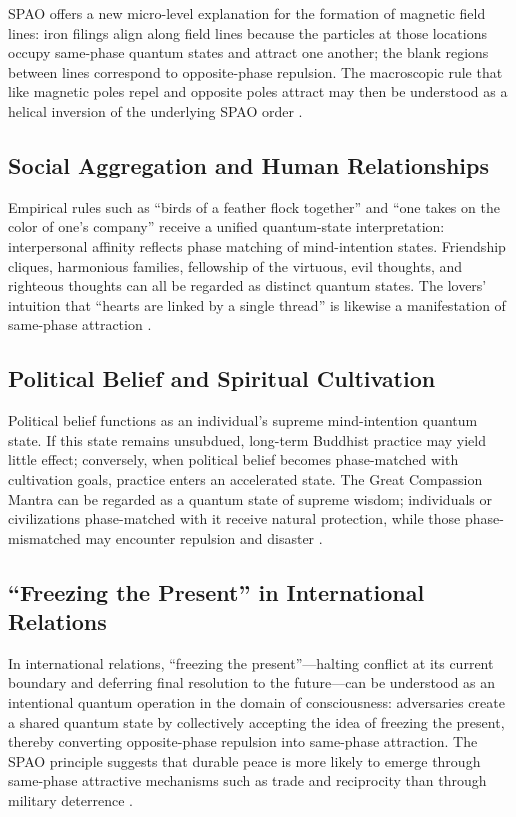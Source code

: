 \documentclass[11pt,a4paper]{article}
\begin{document}
SPAO offers a new micro-level explanation for the formation of magnetic field lines: iron filings align along field lines because the particles at those locations occupy same-phase quantum states and attract one another; the blank regions between lines correspond to opposite-phase repulsion. The macroscopic rule that like magnetic poles repel and opposite poles attract may then be understood as a helical inversion of the underlying SPAO order \cite{Feynman1964}.

\subsection{Social Aggregation and Human Relationships}

Empirical rules such as ``birds of a feather flock together'' and ``one takes on the color of one's company'' receive a unified quantum-state interpretation: interpersonal affinity reflects phase matching of mind-intention states. Friendship cliques, harmonious families, fellowship of the virtuous, evil thoughts, and righteous thoughts can all be regarded as distinct quantum states. The lovers' intuition that ``hearts are linked by a single thread'' is likewise a manifestation of same-phase attraction \cite{Li2026}.

\subsection{Political Belief and Spiritual Cultivation}

Political belief functions as an individual's supreme mind-intention quantum state. If this state remains unsubdued, long-term Buddhist practice may yield little effect; conversely, when political belief becomes phase-matched with cultivation goals, practice enters an accelerated state. The Great Compassion Mantra can be regarded as a quantum state of supreme wisdom; individuals or civilizations phase-matched with it receive natural protection, while those phase-mismatched may encounter repulsion and disaster \cite{Dharani}.

\subsection{``Freezing the Present'' in International Relations}

In international relations, ``freezing the present''---halting conflict at its current boundary and deferring final resolution to the future---can be understood as an intentional quantum operation in the domain of consciousness: adversaries create a shared quantum state by collectively accepting the idea of freezing the present, thereby converting opposite-phase repulsion into same-phase attraction. The SPAO principle suggests that durable peace is more likely to emerge through same-phase attractive mechanisms such as trade and reciprocity than through military deterrence \cite{Li2026}.
\end{document}
